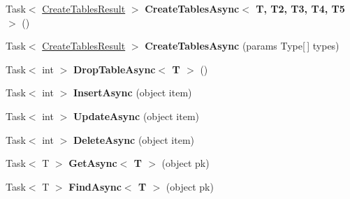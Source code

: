 \begin{DoxyCompactItemize}
\item 
\hypertarget{classSQLite_1_1SQLiteAsyncConnection_a9b3c8584432d04508c89aebbbb1fedea}{}Task$<$ \hyperlink{classSQLite_1_1CreateTablesResult}{Create\+Tables\+Result} $>$ {\bfseries Create\+Tables\+Async$<$ T, T2, T3, T4, T5 $>$} ()\label{classSQLite_1_1SQLiteAsyncConnection_a9b3c8584432d04508c89aebbbb1fedea}

\item 
\hypertarget{classSQLite_1_1SQLiteAsyncConnection_af98ef3fd9628a9cda7b2b0532291f04b}{}Task$<$ \hyperlink{classSQLite_1_1CreateTablesResult}{Create\+Tables\+Result} $>$ {\bfseries Create\+Tables\+Async} (params Type\mbox{[}$\,$\mbox{]} types)\label{classSQLite_1_1SQLiteAsyncConnection_af98ef3fd9628a9cda7b2b0532291f04b}

\item 
\hypertarget{classSQLite_1_1SQLiteAsyncConnection_a6781339fb664cde6494460e686f5cb60}{}Task$<$ int $>$ {\bfseries Drop\+Table\+Async$<$ T $>$} ()\label{classSQLite_1_1SQLiteAsyncConnection_a6781339fb664cde6494460e686f5cb60}

\item 
\hypertarget{classSQLite_1_1SQLiteAsyncConnection_a7c621805c4f3185e9b064288b2b47d4a}{}Task$<$ int $>$ {\bfseries Insert\+Async} (object item)\label{classSQLite_1_1SQLiteAsyncConnection_a7c621805c4f3185e9b064288b2b47d4a}

\item 
\hypertarget{classSQLite_1_1SQLiteAsyncConnection_a3950c4feb7a8d2964a42167d8a4516a0}{}Task$<$ int $>$ {\bfseries Update\+Async} (object item)\label{classSQLite_1_1SQLiteAsyncConnection_a3950c4feb7a8d2964a42167d8a4516a0}

\item 
\hypertarget{classSQLite_1_1SQLiteAsyncConnection_ac34ee6c331f35dc8cbb73a0373315fb0}{}Task$<$ int $>$ {\bfseries Delete\+Async} (object item)\label{classSQLite_1_1SQLiteAsyncConnection_ac34ee6c331f35dc8cbb73a0373315fb0}

\item 
\hypertarget{classSQLite_1_1SQLiteAsyncConnection_a59792569de902bd2e87b967a35154d4c}{}Task$<$ T $>$ {\bfseries Get\+Async$<$ T $>$} (object pk)\label{classSQLite_1_1SQLiteAsyncConnection_a59792569de902bd2e87b967a35154d4c}

\item 
\hypertarget{classSQLite_1_1SQLiteAsyncConnection_a4e09e6aacf646853516ab1befea4ac4b}{}Task$<$ T $>$ {\bfseries Find\+Async$<$ T $>$} (object pk)\label{classSQLite_1_1SQLiteAsyncConnection_a4e09e6aacf646853516ab1befea4ac4b}


\end{DoxyCompactItemize}
